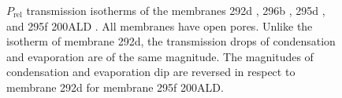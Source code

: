 \documentclass[../../../thesis.tex]{subfiles}
\begin{document}
\begin{figure}[ht]
{
        \label{subfig:295f200ALD_trans}}
    \caption{$P_\mathrm{rel}$ transmission isotherms of the membranes 292d \protect{}, 296b \protect{}, 295d \protect{},
    and 295f 200ALD \protect{}. All membranes have open pores. Unlike the isotherm of membrane 292d, the transmission drops of
    condensation and evaporation are of the same magnitude. The magnitudes of condensation and evaporation dip are reversed in respect to membrane 292d for membrane 295f 200ALD.}
    \label{fig:295_296_transmission}
  \end{figure}
\end{document}

